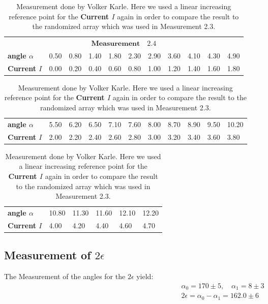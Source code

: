    \begin{table}[htdp]
        \begin{tabular}{|l||p{1.1cm}|p{1.1cm}|p{1.1cm}|p{1.1cm}|p{1.1cm}|p{1.1cm}|p{1.1cm}|p{1.1cm}|p{1.1cm}|p{1.1cm}|}
        \hline
            \multicolumn{11}{|c|}{\cellcolor[RGB]{206,250,201}$
            \mathbf{Measurement \quad 2.4}$} \\
\textbf{angle $\alpha$}& 0.50& 0.80& 1.40& 1.80& 2.30& 2.90& 3.60& 4.10& 4.30& 4.90 \\
\textbf{Current $I$}& 0.00& 0.20& 0.40& 0.60& 0.80& 1.00& 1.20& 1.40& 1.60& 1.80 \\

        \hline
        \end{tabular}
        \begin{tabular}{|l||p{1.1cm}|p{1.1cm}|p{1.1cm}|p{1.1cm}|p{1.1cm}|p{1.1cm}|p{1.1cm}|p{1.1cm}|p{1.1cm}|p{1.1cm}|}
        \hline\textbf{angle $\alpha$}& 5.50& 6.20& 6.50& 7.10& 7.60& 8.00& 8.70& 8.90& 9.50& 10.20 \\
\textbf{Current $I$}& 2.00& 2.20& 2.40& 2.60& 2.80& 3.00& 3.20& 3.40& 3.60& 3.80 \\

        \hline
        \end{tabular}
    \begin{tabular}{|l||p{1.1cm}|p{1.1cm}|p{1.1cm}|p{1.1cm}|p{1.1cm}|}
    \hline\textbf{angle $\alpha$}& 10.80& 11.30& 11.60& 12.10& 12.20 \\
\textbf{Current $I$}& 4.00& 4.20& 4.40& 4.60& 4.70 \\

    \hline
    \end{tabular}
    \caption{Measurement done by Volker Karle. Here we used a linear increasing reference point
        for the \textbf{Current $I$} again in order to compare the result to the randomized
        array which was used in Measurement 2.3.}
    \label{Power05}
    \end{table}
  
\subsection{Measurement of $2\epsilon$}

\begin{center}
 The Measurement of the angles for the $2\epsilon$ yield:
\begin{align}
    \alpha_0 = 170 \pm 5, \quad
    \alpha_1 = 8   \pm 3 \\
    2\epsilon = \alpha_0 - \alpha_1 = 162.0 \pm 6   
\end{align}
\end{center}

